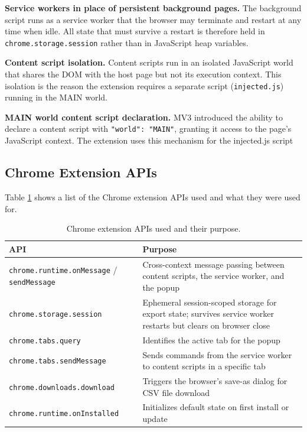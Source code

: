 \textbf{Service workers in place of persistent background pages.} The background script runs as a service worker that the browser may terminate and restart at any time when idle. All state that must survive a restart is therefore held in \texttt{chrome.storage.session} rather than in JavaScript heap variables.

\textbf{Content script isolation.} Content scripts run in an isolated JavaScript world that shares the DOM with the host page but not its execution context. This isolation is the reason the extension requires a separate script (\texttt{injected.js}) running in the MAIN world.

\textbf{MAIN world content script declaration.} MV3 introduced the ability to declare a content script with \texttt{"world": "MAIN"}, granting it access to the page's JavaScript context. The extension uses this mechanism for the injected.js script

\subsection{Chrome Extension APIs}

Table \ref{tab:chrome_api_usage} shows a list of the Chrome extension APIs used and what they were used for.

\begin{table}[h]
    \centering
    \begin{tabular}{p{} p{}}
        \toprule
        \textbf{API} & \textbf{Purpose} \\
        \midrule
         \texttt{chrome.runtime.onMessage} / \texttt{sendMessage} & Cross-context message passing between content scripts, the service worker, and the popup \\
         \texttt{chrome.storage.session} & Ephemeral session-scoped storage for export state; survives service worker restarts but clears on browser close \\
         \texttt{chrome.tabs.query} & Identifies the active tab for the popup \\
         \texttt{chrome.tabs.sendMessage} & Sends commands from the service worker to content scripts in a specific tab \\
         \texttt{chrome.downloads.download} & Triggers the browser's save-as dialog for CSV file download \\
         \texttt{chrome.runtime.onInstalled} & Initializes default state on first install or update \\
        \bottomrule
    \end{tabular}
    \caption{Chrome extension APIs used and their purpose.}
    \label{tab:chrome_api_usage}
\end{table}

